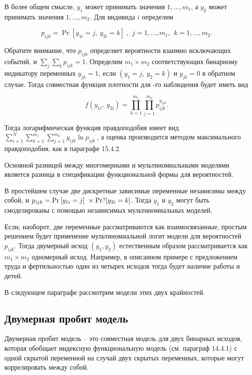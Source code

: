 В более общем смысле, $y_1$ может принимать значения $1,\dots ,m_1$, а $y_2$ может принимать значения $1,\dots ,m_2$. Для индивида $i$ определим

\begin{equation} \label{GrindEQ__15_50_} p_{ijk}={\Pr  \left[y_{1i}=j,\ y_{2i}=k\right]\ },\ \ j=1,\dots ,m_1,\ \ k=1,\dots ,m_2. \end{equation} 

Обратите внимание, что $p_{ijk}$ определяет вероятности взаимно исключающих событий, и $\sum_j{\sum_k{p_{ijk}=1}}$. Определим $m_1\times m_2$ соответствующих бинарному индикатору переменных $y_{jk}=1$, если $(y_1=j,\ y_2=k)$ и $y_{jk}=0$ в обратном случае. Тогда совместная функция плотности для -го наблюдения будет иметь вид

\[f\left(y_{1i},\ y_{2i}\right)=\prod^{m_1}_{k=1}{\prod^{m_2}_{j=1}{p^{y_{ijk}}_{ijk}}}.\] 

Тогда логарифмическая функция правдоподобия имеет вид $\sum^N_{i=1}{\sum^{m_1}_{k=1}{\sum^{m_2}_{j=1}{y_{ijk}{\ln  p_{ijk}\ }}}}$, а оценка производится методом максимального правдоподобия, как в параграфе 15.4.2.

Основной разницей между многомерными и мультиномиальными моделями является разница в спецификации функциональной формы для вероятностей.

В простейшем случае две дискретные зависимые переменные независимы между собой, и $p_{ijk}={\Pr  \left[y_{1i}=j\right]\ }\times {\rm Pr}?[y_{2i}=k]$. Тогда $y_1$ и $y_2$ могут быть смоделированы с помощью независимых мультиномиальных моделей.

Если, наоборот, две переменные рассматриваются как взаимосвязанные, простым решением будет применение мультиномиальной логит модели для вероятностей $p_{ijk}$. Тогда двумерный исход $(y_1,y_2)$ естественным образом рассматривается как $m_1\times m_2$ одномерный исход. Например, в описанном примере с предложением труда и фертильностью один из четырех исходов тогда будет наличие работы и детей.

В следующем параграфе рассмотрим модели этих двух крайностей.

\subsection{Двумерная пробит модель}

Двумерная пробит модель -- это совместная модель для двух бинарных исходов, которая обобщает индексную функциональную модель (см. параграф 14.4.1) с одной скрытой переменной на случай двух скрытых переменных, которые могут коррелировать между собой.

